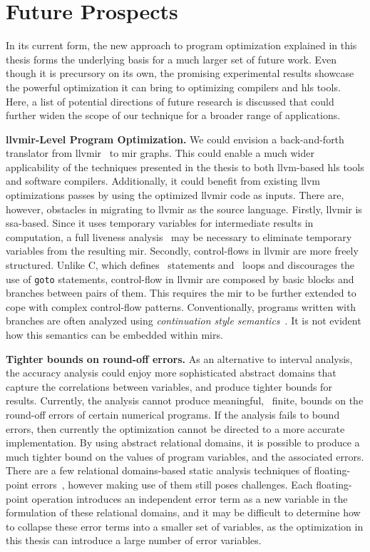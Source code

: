 \section{Future Prospects}
\label{cc:sec:future_prospects}

In its current form, the new approach to program optimization explained in this
thesis forms the underlying basis for a much larger set of future work.  Even
though it is precursory on its own, the promising experimental results showcase
the powerful optimization it can bring to optimizing compilers and \gls{hls}
tools.  Here, a list of potential directions of future research is discussed
that could further widen the scope of our technique for a broader range of
applications.

\textbf{\gls{llvmir}-Level Program Optimization.}  We could envision
a back-and-forth translator from \gls{llvmir}~\cite{llvm, llvm_ir} to
\gls{mir} graphs.  This could enable a much wider applicability of the
techniques presented in the thesis to both \gls{llvm}-based \gls{hls} tools
and software compilers.  Additionally, it could benefit from existing
\gls{llvm} optimizations passes by using the optimized \gls{llvmir} code
as inputs.  There are, however, obstacles in migrating to \gls{llvmir} as
the source language.  Firstly, \gls{llvmir} is \gls{ssa}-based.  Since it
uses temporary variables for intermediate results in computation, a full
liveness analysis~\cite{hathhorn12, nielson99, boissinot08} may be necessary
to eliminate temporary variables from the resulting \gls{mir}\@.  Secondly,
control-flows in \gls{llvmir} are more freely structured.  Unlike C, which
defines \iflit~statements and \whilelit~loops and discourages the use of
\verb|goto| statements, control-flow in \gls{llvmir} are composed by basic
blocks and branches between pairs of them.  This requires the \gls{mir} to be
further extended to cope with complex control-flow patterns.  Conventionally,
programs written with branches are often analyzed using \emph{continuation
style semantics}~\cite{felleisen88}.  It is not evident how this semantics can
be embedded within \glspl{mir}.

\textbf{Tighter bounds on round-off errors.} As an alternative to interval
analysis, the accuracy analysis could enjoy more sophisticated abstract domains
that capture the correlations between variables, and produce tighter bounds
for results.  Currently, the analysis cannot produce meaningful, \ie~finite,
bounds on the round-off errors of certain numerical programs.  If the analysis
fails to bound errors, then currently the optimization cannot be directed
to a more accurate implementation.  By using abstract relational domains,
it is possible to produce a much tighter bound on the values of program
variables, and the associated errors.  There are a few relational domains-based
static analysis techniques of floating-point errors~\cite{mine07_2, putot04,
goubault11, astree}, however making use of them still poses challenges.  Each
floating-point operation introduces an independent error term as a new variable
in the formulation of these relational domains, and it may be difficult to
determine how to collapse these error terms into a smaller set of variables,
as the optimization in this thesis can introduce a large number of error
variables.

